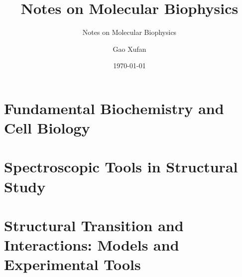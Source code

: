 \documentclass[en,11pt]{elegantbook-my}
\title{Notes on Molecular Biophysics}
\subtitle{Notes on Molecular Biophysics}
\author{Gao Xufan}
\institute{Chemical Biology 81}
\date{\today}
\begin{document}
\maketitle
\frontmatter





\tableofcontents
\thispagestyle{empty}

\mainmatter



\setcounter{page}{0}

\part{Fundamental Biochemistry and Cell Biology}







\part{Spectroscopic Tools in Structural Study}




\part{Structural Transition and Interactions: Models and Experimental Tools}





\end{document}
